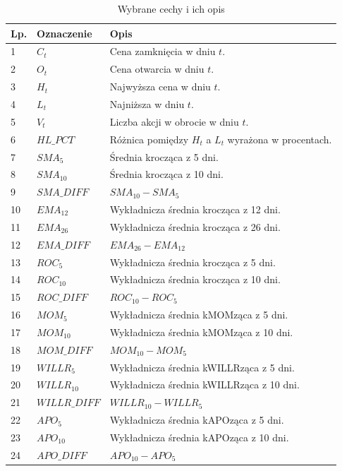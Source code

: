 \documentclass[a4paper, twoside, 11pt, openright]{article}
\begin{document}
\begin{longtable}[c]{| m{0.5cm} m{3cm} m{10cm}|} 
\toprule
  Lp. & Oznaczenie & Opis\\
\midrule
\endhead
\midrule

\midrule
\caption{Wybrane cechy i ich opis}
\label{data_columns_table}
\endfoot

\bottomrule
\endlastfoot

 1 & $C_t$ & Cena zamknięcia w dniu $t$. \\ 
 2 & $O_t$ & Cena otwarcia w dniu $t$. \\
 3 & $H_t$ & Najwyższa cena w dniu $t$. \\
 4 & $L_t$ & Najniższa w dniu $t$. \\
 5 & $V_t$ & Liczba akcji w obrocie w dniu $t$. \\
 6 & $HL\_PCT$ & Różnica pomiędzy $H_t$ a $L_t$ wyrażona w procentach.\\
 7 & $SMA_5$ & Średnia krocząca z 5 dni. \\
 8 & $SMA_{10}$ & Średnia krocząca z 10 dni. \\
 9 & $SMA\_DIFF$ & $SMA_{10}-SMA_{5}$ \\
 10 & $EMA_{12}$ & Wykładnicza średnia krocząca z 12 dni. \\
 11 & $EMA_{26}$ & Wykładnicza średnia krocząca z 26 dni. \\
 12 & $EMA\_DIFF$ & $EMA_{26}-EMA_{12}$ \\
 13 & $ROC_{5}$ & Wykładnicza średnia krocząca z 5 dni. \\
 14 & $ROC_{10}$ & Wykładnicza średnia krocząca z 10 dni. \\
 15 & $ROC\_DIFF$ & $ROC_{10}-ROC_{5}$ \\
  16 & $MOM_{5}$ & Wykładnicza średnia kMOMząca z 5 dni. \\
 17 & $MOM_{10}$ & Wykładnicza średnia kMOMząca z 10 dni. \\
 18 & $MOM\_DIFF$ & $MOM_{10}-MOM_{5}$ \\
  19 & $WILLR_{5}$ & Wykładnicza średnia kWILLRząca z 5 dni. \\
 20 & $WILLR_{10}$ & Wykładnicza średnia kWILLRząca z 10 dni. \\
 21 & $WILLR\_DIFF$ & $WILLR_{10}-WILLR_{5}$ \\
  22 & $APO_{5}$ & Wykładnicza średnia kAPOząca z 5 dni. \\
 23 & $APO_{10}$ & Wykładnicza średnia kAPOząca z 10 dni. \\
 24 & $APO\_DIFF$ & $APO_{10}-APO_{5}$ \\

\end{longtable}
\end{document}
